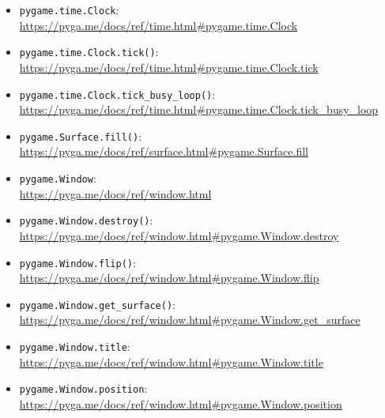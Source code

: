 \begin{pygbox}
\begin{itemize}
	\item \texttt{pygame.time.Clock}:
	\\
	\url{https://pyga.me/docs/ref/time.html#pygame.time.Clock}

	\item \texttt{pygame.time.Clock.tick()}:
	\\
	\url{https://pyga.me/docs/ref/time.html#pygame.time.Clock.tick}
	
	\item \texttt{pygame.time.Clock.tick\_busy\_loop()}:
	\\
	\url{https://pyga.me/docs/ref/time.html#pygame.time.Clock.tick_busy_loop}
	
	\item \texttt{pygame.Surface.fill()}:
	\\
	\url{https://pyga.me/docs/ref/surface.html#pygame.Surface.fill}

	\item \texttt{pygame.Window}:
	\\
	\url{https://pyga.me/docs/ref/window.html}
	
	\item \texttt{pygame.Window.destroy()}:
	\\
	\url{https://pyga.me/docs/ref/window.html#pygame.Window.destroy}

	\item \texttt{pygame.Window.flip()}:
	\\
	\url{https://pyga.me/docs/ref/window.html#pygame.Window.flip}
	
	\item \texttt{pygame.Window.get\_surface()}:
	\\
	\url{https://pyga.me/docs/ref/window.html#pygame.Window.get_surface}
	
	\item \texttt{pygame.Window.title}:
	\\
	\url{https://pyga.me/docs/ref/window.html#pygame.Window.title}
	
	\item \texttt{pygame.Window.position}:
	\\
	\url{https://pyga.me/docs/ref/window.html#pygame.Window.position}
\end{itemize}	
\end{pygbox}


